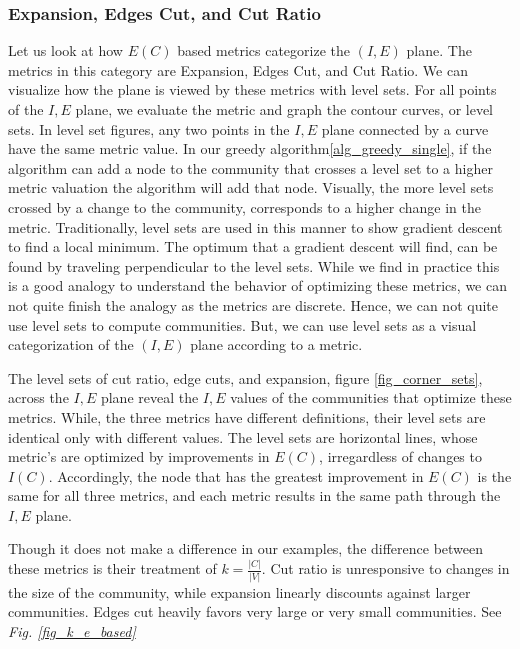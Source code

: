 \documentclass[phd,tocprelim]{cornell}
\begin{document}
\subsubsection{Expansion, Edges Cut, and Cut Ratio}

Let us look at how $E(C)$ based metrics categorize the $(I, E)$ plane.  The metrics in this category are {\sc Expansion}, {\sc Edges Cut}, and {\sc Cut Ratio}.  We can visualize how the plane is viewed by these metrics with level sets.  For all points of the $I,E$ plane, we evaluate the metric and graph the contour curves, or level sets\cite{}.  In level set figures, any two points in the $I,E$ plane connected by a curve have the same metric value. In our greedy algorithm\ref{alg_greedy_single}, if the algorithm can add a node to the community that crosses a level set to a higher metric valuation the algorithm will add that node.  Visually, the more level sets crossed by a change to the community, corresponds to a higher change in the metric.  Traditionally, level sets are used in this manner to show gradient descent to find a local minimum.  The optimum that a gradient descent will find, can be found by traveling perpendicular to the level sets.  While we find in practice this is a good analogy to understand the behavior of optimizing these metrics,  we can not quite finish the analogy as the metrics are discrete.  Hence, we can not quite use level sets to compute communities.  But, we can use level sets as a visual categorization of the $(I, E)$ plane according to a metric.


The level sets of cut ratio, edge cuts, and expansion, figure \ref{fig_corner_sets}, across the $I,E$ plane reveal the $I,E$ values of the communities that optimize these metrics.  While, the three metrics have different definitions, their level sets are identical only with different values.  The level sets are horizontal lines, whose metric's are optimized by improvements in $E(C)$, irregardless of changes to $I(C)$.  Accordingly, the node that has the greatest improvement in $E(C)$ is the same for all three metrics, and each metric results in the same path through the $I,E$ plane.


Though it does not make a difference in our examples, the difference between these metrics is their treatment of $k = \frac{|C|}{|V|}$.  Cut ratio is unresponsive to changes in the size of the community, while expansion linearly discounts against larger communities.  Edges cut heavily favors very large or very small communities.  See {\it Fig. \ref{fig_k_e_based}}
\end{document}
